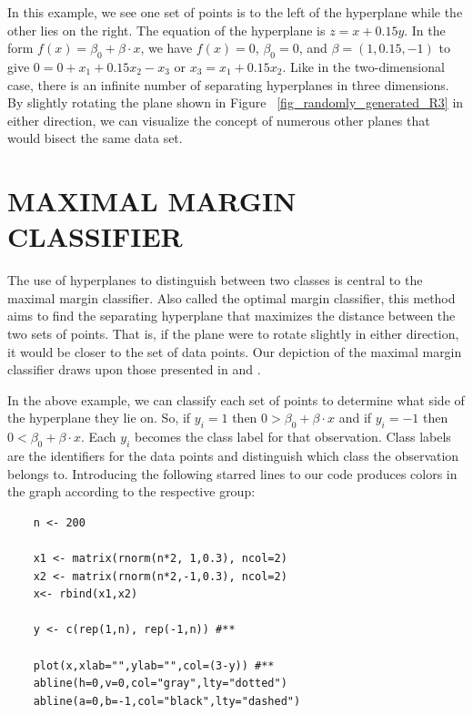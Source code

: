 \documentclass[12pt]{article}
\begin{document}
In this example, we see one set of points is to the left of the hyperplane while the other lies on the right. The equation of the hyperplane is $z = x + 0.15y$. In the form $f(x)=\beta_0 + \beta \cdot x$, we have $f(x)=0$, $\beta_0=0$, and $\beta=(1,0.15,-1)$ to give $0=0+x_1+0.15x_2-x_3$ or $x_3=x_1+0.15x_2$. Like in the two-dimensional case, there is an infinite number of separating hyperplanes in three dimensions. By slightly rotating the plane shown in Figure ~\ref{fig_randomly_generated_R3} in either direction, we can visualize the concept of numerous other planes that would bisect the same data set.

\section{MAXIMAL MARGIN CLASSIFIER}

The use of hyperplanes to distinguish between two classes is central to the maximal margin classifier. Also called the optimal margin classifier, this method aims to find the separating hyperplane that maximizes the distance between the two sets of points. That is, if the plane were to rotate slightly in either direction, it would be closer to the set of data points. Our depiction of the maximal margin classifier draws upon those presented in \cite{introstatlearning} and \cite{teitelbaum2021svmnotes}.

In the above example, we can classify each set of points to determine what side of the hyperplane they lie on. So, if $y_i=1$ then $0>\beta_0 + \beta \cdot x$ and if $y_i=-1$ then $0<\beta_0 + \beta \cdot x$. Each $y_i$ becomes the class label for that observation. Class labels are the identifiers for the data points and distinguish which class the observation belongs to. Introducing the following starred lines to our code produces colors in the graph according to the respective group:

\begin{verbatim}
    n <- 200

    x1 <- matrix(rnorm(n*2, 1,0.3), ncol=2)
    x2 <- matrix(rnorm(n*2,-1,0.3), ncol=2)
    x<- rbind(x1,x2)

    y <- c(rep(1,n), rep(-1,n)) #**

    plot(x,xlab="",ylab="",col=(3-y)) #**
    abline(h=0,v=0,col="gray",lty="dotted")
    abline(a=0,b=-1,col="black",lty="dashed")
\end{verbatim}
\end{document}
